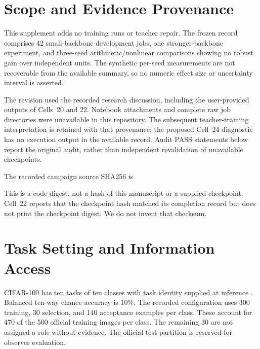 \documentclass{article}
\begin{document}
\printAffiliationsAndNotice{}
\appendix
\section{Scope and Evidence Provenance}
This supplement adds no training runs or teacher repair. The frozen record comprises 42 small-backbone development jobs, one stronger-backbone experiment, and three-seed arithmetic/nonlinear comparisons showing no robust gain over independent units. The synthetic per-seed measurements are not recoverable from the available summary, so no numeric effect size or uncertainty interval is asserted.

The revision used the recorded research discussion, including the user-provided outputs of Cells~20 and 22. Notebook attachments and complete raw job directories were unavailable in this repository. The subsequent teacher-training interpretation is retained with that provenance; the proposed Cell~24 diagnostic has no execution output in the available record. Audit PASS statements below report the original audit, rather than independent revalidation of unavailable checkpoints.

The recorded campaign source SHA256 is
\begin{quote}\small\ttfamily
{}
\end{quote}
This is a code digest, not a hash of this manuscript or a supplied checkpoint. Cell~22 reports that the checkpoint hash matched its completion record but does not print the checkpoint digest. We do not invent that checksum.

\section{Task Setting and Information Access}
CIFAR-100 has ten tasks of ten classes with task identity supplied at inference \cite{krizhevsky2009}. Balanced ten-way chance accuracy is 10\%. The recorded configuration uses 300 training, 30 selection, and 140 acceptance examples per class. These account for 470 of the 500 official training images per class. The remaining 30 are not assigned a role without evidence. The official test partition is reserved for observer evaluation.
\end{document}
